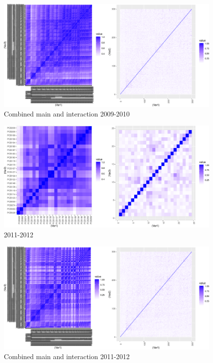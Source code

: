 \documentclass[]{article}
\begin{document}
\begin{figure}
\centering
\includegraphics{PCBs_covariance_files/figure-latex/unnamed-chunk-24-1.pdf}
\caption{Combined main and interaction 2009-2010}
\end{figure}

\begin{figure}
\centering
\includegraphics{PCBs_covariance_files/figure-latex/unnamed-chunk-25-1.pdf}
\caption{2011-2012}
\end{figure}

\begin{figure}
\centering
\includegraphics{PCBs_covariance_files/figure-latex/unnamed-chunk-26-1.pdf}
\caption{Combined main and interaction 2011-2012}
\end{figure}
\end{document}
